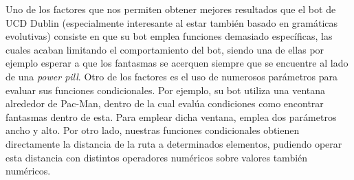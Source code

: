 Uno de los factores que nos permiten obtener mejores resultados que el bot \cite{galvan2010evolving} de UCD Dublin (especialmente interesante al estar también basado en gramáticas evolutivas) consiste en que su bot emplea funciones demasiado específicas, las cuales acaban limitando el comportamiento del bot, siendo una de ellas por ejemplo esperar a que los fantasmas se acerquen siempre que se encuentre al lado de una \textit{power pill}. 
Otro de los factores es el uso de numerosos parámetros para evaluar sus funciones condicionales. Por ejemplo, su bot utiliza una ventana alrededor de Pac-Man, dentro de la cual evalúa condiciones como encontrar fantasmas dentro de esta. Para emplear dicha ventana, emplea dos parámetros ancho y alto. Por otro lado, nuestras funciones condicionales obtienen directamente la distancia de la ruta a determinados elementos, pudiendo operar esta distancia con distintos operadores numéricos sobre valores también numéricos.
